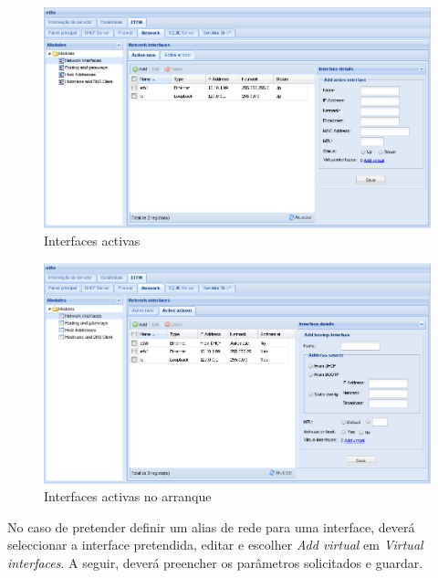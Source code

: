 \begin{figure}[H]
    \begin{center}
    \includegraphics[scale=0.38]{screenshots/etfw/etfw_network_interfaces_01.png}
    \caption{Interfaces activas}
    \label{fig:etfw_network_interfaces_01}
    \end{center}
\end{figure}

\begin{figure}[H]
    \begin{center}
    \includegraphics[scale=0.38]{screenshots/etfw/etfw_network_interfaces_02.png}
    \caption{Interfaces activas no arranque}
    \label{fig:etfw_network_interfaces_02}
    \end{center}
\end{figure}

No caso de pretender definir um alias de rede para uma interface, deverá seleccionar a interface pretendida, editar e escolher \textit{Add virtual} em \textit{Virtual interfaces}. A seguir, deverá preencher os parâmetros solicitados e guardar.

